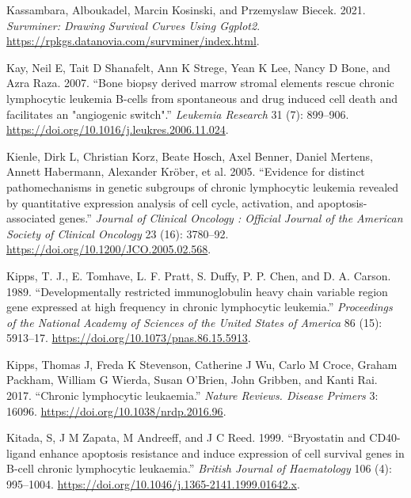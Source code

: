 \documentclass[11pt, a4paper, twosided]{book}
\newenvironment{CSLReferences}%
  {}%
  {\par}
\begin{document}
\begin{CSLReferences}{1}{0}
\leavevmode{}%
Kassambara, Alboukadel, Marcin Kosinski, and Przemyslaw Biecek. 2021. \emph{Survminer: Drawing Survival Curves Using Ggplot2}. \url{https://rpkgs.datanovia.com/survminer/index.html}.

\leavevmode{}%
Kay, Neil E, Tait D Shanafelt, Ann K Strege, Yean K Lee, Nancy D Bone, and Azra Raza. 2007. {``{Bone biopsy derived marrow stromal elements rescue chronic lymphocytic leukemia B-cells from spontaneous and drug induced cell death and facilitates an "angiogenic switch"}.''} \emph{Leukemia Research} 31 (7): 899--906. \url{https://doi.org/10.1016/j.leukres.2006.11.024}.

\leavevmode{}%
Kienle, Dirk L, Christian Korz, Beate Hosch, Axel Benner, Daniel Mertens, Annett Habermann, Alexander Kröber, et al. 2005. {``{Evidence for distinct pathomechanisms in genetic subgroups of chronic lymphocytic leukemia revealed by quantitative expression analysis of cell cycle, activation, and apoptosis-associated genes.}''} \emph{Journal of Clinical Oncology : Official Journal of the American Society of Clinical Oncology} 23 (16): 3780--92. \url{https://doi.org/10.1200/JCO.2005.02.568}.

\leavevmode{}%
Kipps, T. J., E. Tomhave, L. F. Pratt, S. Duffy, P. P. Chen, and D. A. Carson. 1989. {``{Developmentally restricted immunoglobulin heavy chain variable region gene expressed at high frequency in chronic lymphocytic leukemia}.''} \emph{Proceedings of the National Academy of Sciences of the United States of America} 86 (15): 5913--17. \url{https://doi.org/10.1073/pnas.86.15.5913}.

\leavevmode{}%
Kipps, Thomas J, Freda K Stevenson, Catherine J Wu, Carlo M Croce, Graham Packham, William G Wierda, Susan O'Brien, John Gribben, and Kanti Rai. 2017. {``{Chronic lymphocytic leukaemia.}''} \emph{Nature Reviews. Disease Primers} 3: 16096. \url{https://doi.org/10.1038/nrdp.2016.96}.

\leavevmode{}%
Kitada, S, J M Zapata, M Andreeff, and J C Reed. 1999. {``{Bryostatin and CD40-ligand enhance apoptosis resistance and induce expression of cell survival genes in B-cell chronic lymphocytic leukaemia.}''} \emph{British Journal of Haematology} 106 (4): 995--1004. \url{https://doi.org/10.1046/j.1365-2141.1999.01642.x}.


\end{CSLReferences}
\end{document}
